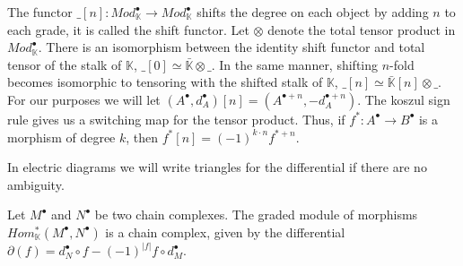 \documentclass[../thesis.tex]{subfiles}
\begin{document}
            The functor $\_[n]:Mod_\mathbb{K}^\bullet\rightarrow Mod_\mathbb{K}^\bullet$ shifts the degree on each object by adding $n$ to each grade, it is called the shift functor. Let $\otimes$ denote the total tensor product in $Mod_\mathbb{K}^\bullet$. There is an isomorphism between the identity shift functor and total tensor of the stalk of $\mathbb{K}$, $\_[0] \simeq \bar{\mathbb{K}}\otimes\_$. In the same manner, shifting $n$-fold becomes isomorphic to tensoring with the shifted stalk of $\mathbb{K}$, $\_[n] \simeq \bar{\mathbb{K}}[n]\otimes\_$. For our purposes we will let $(A^\bullet, d_A^\bullet)[n] = (A^{\bullet + n}, -d_A^{\bullet + n})$. The koszul sign rule gives us a switching map for the tensor product. Thus, if $f^*:A^\bullet\rightarrow B^\bullet$ is a morphism of degree $k$, then $f^*[n] = (-1)^{k\cdot n}f^{*+n}$.


            In electric diagrams we will write triangles for the differential if there are no ambiguity.

            \begin{center}
            \end{center}

            \begin{proposition}
                Let $M^{\bullet}$ and $N^{\bullet}$ be two chain complexes. The graded module of morphisms $Hom_{\mathbb{K}}^*(M^{\bullet},N^{\bullet})$ is a chain complex, given by the differential $\partial(f) = d_N^{\bullet}\circ f - (-1)^{|f|}f\circ d_M^{\bullet}$.
            \end{proposition}
\end{document}
